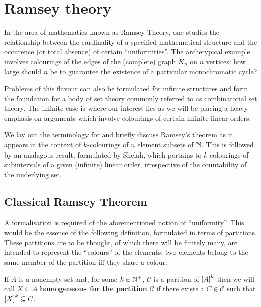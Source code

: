 

\chapter{Ramsey theory}

In the area of mathematics known as Ramsey Theory, one studies the relationship
between the cardinality of a specified mathematical structure and the occurence
(or total absence) of certain ``uniformities''.  The archetypical example
involves colourings of the edges of the (complete) graph $K_n$ on $n$ vertices:
how large should $n$ be to guarantee the existence of a particular monochromatic
cycle?

Problems of this flavour can also be formulated for infinite structures and form
the foundation for a body of set theory commonly referred to as combinatorial
set theory.  The infinite case is where our interest lies as we will be placing
a heavy emphasis on arguments which involve colourings of certain infinite
linear orders.

We lay out the terminology for and briefly discuss Ramsey's theorem as it
appears in the context of $k$-colourings of $n$ element subsets of $\nats$.
This is followed by an analagous result, formulated by Shelah, which pertains to
$k$-colourings of subintervals of a given (infinite) linear order, irrespective
of the countability of the underlying set.

\section{Classical Ramsey Theorem}

A formalisation is required of the aforementioned notion of ``uniformity''.
This would be the essence of the following definition, formulated in terms of
partitions.  These partitions are to be thought, of which there will be finitely
many, are intended to represent the ``colours'' of the elements: two elements
belong to the same member of the partition iff they share a colour.

\begin{dfn}
   If $A$ is a nonempty set and, for some $k\in\posnats$, $\mathcal{C}$ is a
   parition of $\subsets{k}{A}$ then we will call $X\subseteq A$
   \textbf{homogeneous for the partition} $\mathcal{C}$ if there exists a $C\in
   \mathcal{C}$ such that $\subsets{k}{X}\subseteq C$.
\end{dfn}

